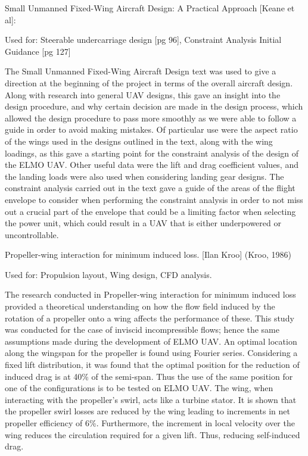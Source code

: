 \documentclass[../../main.tex]{subfiles}
\begin{document}

Small Unmanned Fixed-Wing Aircraft Design: A Practical Approach [Keane et al]: 

Used for: Steerable undercarriage design [pg 96], Constraint Analysis Initial Guidance [pg 127]  

The Small Unmanned Fixed-Wing Aircraft Design text was used to give a direction at the beginning of the project in terms of the overall aircraft design.
Along with research into general UAV designs, this gave an insight into the design procedure, and why certain decision are made in the design process, which allowed the design procedure to pass more smoothly as we were able to follow a guide in order to avoid making mistakes.
Of particular use were the aspect ratio of the wings used in the designs outlined in the text, along with the wing loadings, as this gave a starting point for the constraint analysis of the design of the ELMO UAV.
Other useful data were the lift and drag coefficient values, and the landing loads were also used when considering landing gear designs.
The constraint analysis carried out in the text gave a guide of the areas of the flight envelope to consider when performing the constraint analysis in order to not miss out a crucial part of the envelope that could be a limiting factor when selecting the power unit, which could result in a UAV that is either underpowered or uncontrollable. 

Propeller-wing interaction for minimum induced loss. [Ilan Kroo] (Kroo, 1986) 

Used for: Propulsion layout, Wing design, CFD analysis. 

The research conducted in Propeller-wing interaction for minimum induced loss provided a theoretical understanding on how the flow field induced by the rotation of a propeller onto a wing affects the performance of these.
This study was conducted for the case of inviscid incompressible flows; hence the same assumptions made during the development of ELMO UAV.
An optimal location along the wingspan for the propeller is found using Fourier series.
Considering a fixed lift distribution, it was found that the optimal position for the reduction of induced drag is at 40\% of the semi-span.
Thus the use of the same position for one of the configurations is to be tested on ELMO UAV.
The wing, when interacting with the propeller’s swirl, acts like a turbine stator.
It is shown that the propeller swirl losses are reduced by the wing leading to increments in net propeller efficiency of 6\%.
Furthermore, the increment in local velocity over the wing reduces the circulation required for a given lift.
Thus, reducing self-induced drag. 
\end{document}
